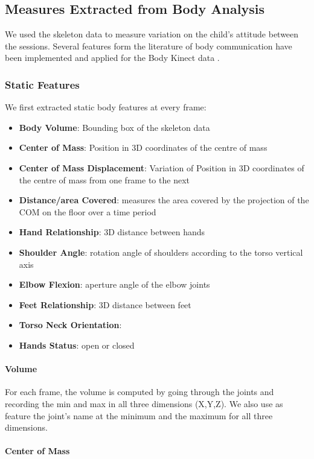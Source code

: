 \subsection{Measures Extracted from Body Analysis}
We used the skeleton data to measure variation on the child's attitude between the sessions.
Several features form the literature of body communication have been implemented and applied for the Body Kinect data \cite{larboulette2015review}.

\subsubsection{Static Features}
We first extracted static body features at every frame:
\begin{itemize}[noitemsep,nolistsep]
\item \textbf{Body Volume}: Bounding box of the skeleton data
\item \textbf{Center of Mass}: Position in 3D coordinates of the centre of mass
\item \textbf{Center of Mass Displacement}: Variation of Position in 3D coordinates of the centre of mass from one frame to the next
\item \textbf{Distance/area Covered}: measures the area covered by the projection of the COM on the floor over a time period
\item \textbf{Hand Relationship}: 3D distance between hands
\item \textbf{Shoulder Angle}: rotation angle of shoulders according to the torso vertical axis
\item \textbf{Elbow Flexion}: aperture angle of the elbow joints
\item \textbf{Feet Relationship}: 3D distance between feet
\item \textbf{Torso Neck Orientation}: %
\item \textbf{Hands Status}: open or closed
\end{itemize}

\paragraph{Volume}
For each frame, the volume is computed by going through the joints and recording the min and max in all three dimensions (X,Y,Z).
We also use as feature the joint's name at the minimum and the maximum for all three dimensions.

\paragraph{Center of Mass}

